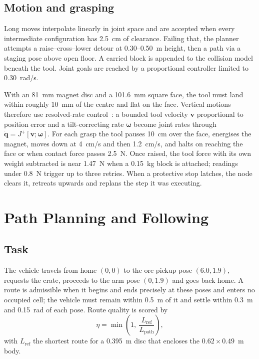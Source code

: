 \documentclass[conference]{IEEEtran}
\begin{document}
\subsection{Motion and grasping}
Long moves interpolate linearly in joint space and are accepted when every intermediate configuration has 2.5~cm of clearance. Failing that, the planner attempts a raise--cross--lower detour at 0.30--0.50~m height, then a path via a staging pose above open floor. A carried block is appended to the collision model beneath the tool. Joint goals are reached by a proportional controller limited to 0.30~rad/s.

With an 81~mm magnet disc and a 101.6~mm square face, the tool must land within roughly 10~mm of the centre and flat on the face. Vertical motions therefore use resolved-rate control~\cite{whitney1969}: a bounded tool velocity $\mathbf{v}$ proportional to position error and a tilt-correcting rate $\boldsymbol{\omega}$ become joint rates through $\dot{\mathbf{q}} = J^{+}[\mathbf{v};\boldsymbol{\omega}]$. For each grasp the tool pauses 10~cm over the face, energises the magnet, moves down at 4~cm/s and then 1.2~cm/s, and halts on reaching the face or when contact force passes 2.5~N. Once raised, the tool force with its own weight subtracted is near 1.47~N when a 0.15~kg block is attached; readings under 0.8~N trigger up to three retries. When a protective stop latches, the node clears it, retreats upwards and replans the step it was executing.

\section{Path Planning and Following}
\subsection{Task}
The vehicle travels from home $(0,0)$ to the ore pickup pose $(6.0,1.9)$, requests the crate, proceeds to the arm pose $(0,1.9)$ and goes back home. A route is admissible when it begins and ends precisely at these poses and enters no occupied cell; the vehicle must remain within 0.5~m of it and settle within 0.3~m and 0.15~rad of each pose. Route quality is scored by
\begin{equation}
\eta = \min\!\left(1,\ \frac{L_{\text{ref}}}{L_{\text{path}}}\right), \label{eq:eff}
\end{equation}
with $L_{\text{ref}}$ the shortest route for a 0.395~m disc that encloses the $0.62\times0.49$~m body.
\end{document}
